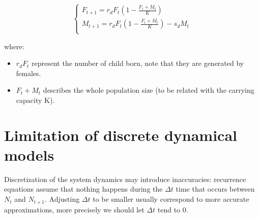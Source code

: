 \[
\begin{cases} 
        F_{t+1} = r_{d}F_{t}(1 - \frac{F_{t} + M_{t}} {K}) \\
        M_{t+1} = r_{d}F_{t}(1 - \frac{F_{t} + M_{t}}{K}) - s_{d}M_{t}\\
\end{cases}
\]

where:
\begin{itemize}
    \item $r_{d}F_{t}$ represent the number of child born, note that they are generated by females.

    \item $F_{t} + M_{t}$ describes the whole population size (to be related with the carrying capacity K).
\end{itemize}

\section{Limitation of discrete dynamical models}
Discretization of the system dynamics may introduce inaccuracies: recurrence equations assume that nothing happens during the $\Delta{t}$ time that occurs between $N_{t}$ and $N_{t+1}$. Adjusting $\Delta{t}$ to be smaller usually correspond to more accurate approximations, more precisely we should let $\Delta{t}$ tend to 0.

